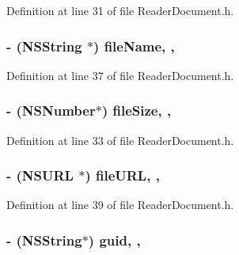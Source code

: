 Definition at line 31 of file Reader\-Document.\-h.

\hypertarget{interface_reader_document_a1c95075453d9fde3a66ac3238496a8cb}{
\subsubsection[{file\-Name}]{\setlength{\rightskip}{0pt plus 5cm}-\/ (N\-S\-String $\ast$) file\-Name\hspace{0.3cm}{\ttfamily [read]}, {\ttfamily [nonatomic]}, {\ttfamily [strong]}}}\label{dc/d78/interface_reader_document_a1c95075453d9fde3a66ac3238496a8cb}


Definition at line 37 of file Reader\-Document.\-h.

\hypertarget{interface_reader_document_a4c9221246aa089f1471bb9f58022629d}{
\subsubsection[{file\-Size}]{\setlength{\rightskip}{0pt plus 5cm}-\/ (N\-S\-Number$\ast$) file\-Size\hspace{0.3cm}{\ttfamily [read]}, {\ttfamily [nonatomic]}, {\ttfamily [strong]}}}\label{dc/d78/interface_reader_document_a4c9221246aa089f1471bb9f58022629d}


Definition at line 33 of file Reader\-Document.\-h.

\hypertarget{interface_reader_document_a76f21379e86bce6c49b5e7469494fdbc}{
\subsubsection[{file\-U\-R\-L}]{\setlength{\rightskip}{0pt plus 5cm}-\/ (N\-S\-U\-R\-L $\ast$) file\-U\-R\-L\hspace{0.3cm}{\ttfamily [read]}, {\ttfamily [nonatomic]}, {\ttfamily [strong]}}}\label{dc/d78/interface_reader_document_a76f21379e86bce6c49b5e7469494fdbc}


Definition at line 39 of file Reader\-Document.\-h.

\hypertarget{interface_reader_document_a1d10bceac39442fdd660c1696edf2573}{
\subsubsection[{guid}]{\setlength{\rightskip}{0pt plus 5cm}-\/ (N\-S\-String$\ast$) guid\hspace{0.3cm}{\ttfamily [read]}, {\ttfamily [nonatomic]}, {\ttfamily [strong]}}}\label{dc/d78/interface_reader_document_a1d10bceac39442fdd660c1696edf2573}


